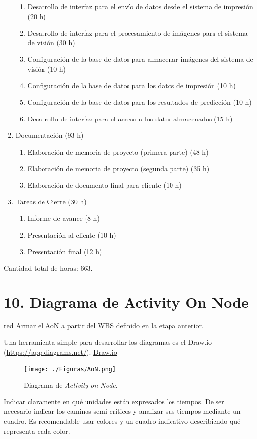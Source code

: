 \documentclass[
11pt, %
]{charter}
\begin{document}
\begin{enumerate}
\begin{enumerate}
        \item Desarrollo de interfaz para el envío de datos desde el sistema de impresión (20 h)
        \item Desarrollo de interfaz para el procesamiento de imágenes para el sistema de visión (30 h)
        \item Configuración de la base de datos para almacenar imágenes del sistema de visión (10 h)
        \item Configuración de la base de datos para los datos de impresión (10 h)
        \item Configuración de la base de datos para los resultados de predicción (10 h)
        \item Desarrollo de interfaz para el acceso a los datos almacenados (15 h)
    \end{enumerate}
    \item Documentación (93 h)
    \begin{enumerate}
        \item Elaboración de memoria de proyecto (primera parte) (48 h)
        \item Elaboración de memoria de proyecto (segunda parte) (35 h)
        \item Elaboración de documento final para cliente (10 h)
    \end{enumerate}
    \item Tareas de Cierre  (30 h)
    \begin{enumerate}
        \item Informe de avance (8 h)
        \item Presentación al cliente (10 h)
        \item Presentación final (12 h)
    \end{enumerate}
\end{enumerate}

Cantidad total de horas: 663.

\section{10. Diagrama de Activity On Node}
\label{sec:AoN}

\begin{consigna}{red}
Armar el AoN a partir del WBS definido en la etapa anterior.

Una herramienta simple para desarrollar los diagramas es el Draw.io (\url{https://app.diagrams.net/}).
\href{https://app.diagrams.net}{Draw.io}


\begin{figure}[htpb]
\centering 
\texttt{[image: ./Figuras/AoN.png]}
\caption{Diagrama de \textit{Activity on Node}.}
\label{fig:AoN}
\end{figure}

Indicar claramente en qué unidades están expresados los tiempos.
De ser necesario indicar los caminos semi críticos y analizar sus tiempos mediante un cuadro.
Es recomendable usar colores y un cuadro indicativo describiendo qué representa cada color.

\end{consigna}
\end{document}
